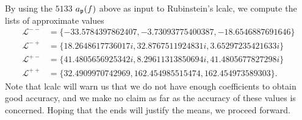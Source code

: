 \documentclass{amsart}
\begin{document}
By using the $5133$ $a_{\mathfrak{p}}(f)$ above as input to Rubinstein's lcalc, we compute the
lists of approximate values
\[
\begin{split}
\mathcal{L}^{--} &= \{-33.5784397862407, -3.73093775400387, -18.6546887691646 \} \\ 
\mathcal{L}^{-+} &= \{18.2648617736017i, 32.8767511924831i, 3.65297235421633i \} \\
\mathcal{L}^{+-} &= \{41.4805656925342i, 8.29611313850694i, 41.4805677827298i\} \\
\mathcal{L}^{++} &= \{32.4909970742969, 162.454985515474, 162.454973589303\}.
\end{split}
\]
Note that lcalc will warn us that we do not have enough coefficients to obtain good
accuracy, and we make no claim as far as the accuracy of these values is concerned.
Hoping that the ends will justify the means, we proceed forward.
\end{document}
